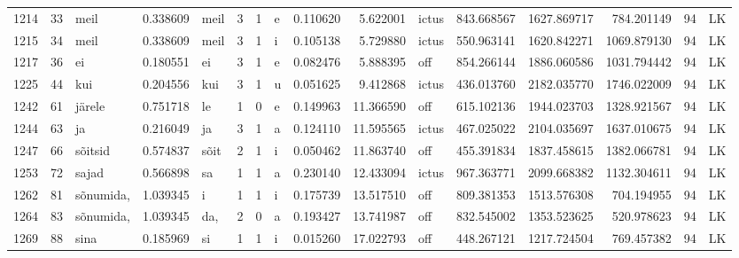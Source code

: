 \begin{tabular}{lrlrllllrrlrrrll}
1214 &          33 &             meil &  0.338609 &    meil &        3 &      1 &       e &      0.110620 &      5.622001 &  ictus &   843.668567 &  1627.869717 &   784.201149 &     94 &        LK \\
1215 &          34 &             meil &  0.338609 &    meil &        3 &      1 &       i &      0.105138 &      5.729880 &  ictus &   550.963141 &  1620.842271 &  1069.879130 &     94 &        LK \\
1217 &          36 &               ei &  0.180551 &      ei &        3 &      1 &       e &      0.082476 &      5.888395 &    off &   854.266144 &  1886.060586 &  1031.794442 &     94 &        LK \\
1225 &          44 &              kui &  0.204556 &     kui &        3 &      1 &       u &      0.051625 &      9.412868 &  ictus &   436.013760 &  2182.035770 &  1746.022009 &     94 &        LK \\
1242 &          61 &           järele &  0.751718 &      le &        1 &      0 &       e &      0.149963 &     11.366590 &    off &   615.102136 &  1944.023703 &  1328.921567 &     94 &        LK \\
1244 &          63 &               ja &  0.216049 &      ja &        3 &      1 &       a &      0.124110 &     11.595565 &  ictus &   467.025022 &  2104.035697 &  1637.010675 &     94 &        LK \\
1247 &          66 &          sõitsid &  0.574837 &    sõit &        2 &      1 &       i &      0.050462 &     11.863740 &    off &   455.391834 &  1837.458615 &  1382.066781 &     94 &        LK \\
1253 &          72 &            sajad &  0.566898 &      sa &        1 &      1 &       a &      0.230140 &     12.433094 &  ictus &   967.363771 &  2099.668382 &  1132.304611 &     94 &        LK \\
1262 &          81 &        sõnumida, &  1.039345 &       i &        1 &      1 &       i &      0.175739 &     13.517510 &    off &   809.381353 &  1513.576308 &   704.194955 &     94 &        LK \\
1264 &          83 &        sõnumida, &  1.039345 &     da, &        2 &      0 &       a &      0.193427 &     13.741987 &    off &   832.545002 &  1353.523625 &   520.978623 &     94 &        LK \\
1269 &          88 &             sina &  0.185969 &      si &        1 &      1 &       i &      0.015260 &     17.022793 &    off &   448.267121 &  1217.724504 &   769.457382 &     94 &        LK \\

\end{tabular}
